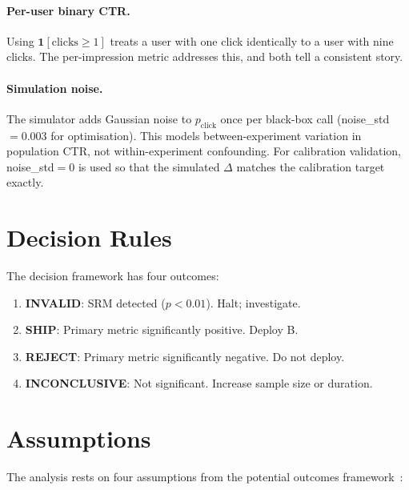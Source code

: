 \documentclass[a4paper,12pt]{extarticle}
\numberwithin{equation}{section}
\begin{document}
\paragraph{Per-user binary CTR.} Using $\mathbf{1}[\text{clicks} \geq 1]$
treats a user with one click identically to a user with nine clicks. The
per-impression metric addresses this, and both tell a consistent story.

\paragraph{Simulation noise.} The simulator adds Gaussian noise to
$p_{\text{click}}$ once per black-box call (noise\_std$= 0.003$ for
optimisation). This models between-experiment variation in population CTR,
not within-experiment confounding. For calibration validation,
noise\_std$= 0$ is used so that the simulated $\Delta$ matches the
calibration target exactly.

\section{Decision Rules}

The decision framework has four outcomes:

\begin{enumerate}
    \item \textbf{INVALID}: SRM detected ($p < 0.01$). Halt; investigate.
    \item \textbf{SHIP}: Primary metric significantly positive. Deploy B.
    \item \textbf{REJECT}: Primary metric significantly negative. Do not deploy.
    \item \textbf{INCONCLUSIVE}: Not significant. Increase sample size or duration.
\end{enumerate}

\section{Assumptions}

The analysis rests on four assumptions from the potential outcomes
framework~\cite{rubin1999teaching}:
\end{document}
